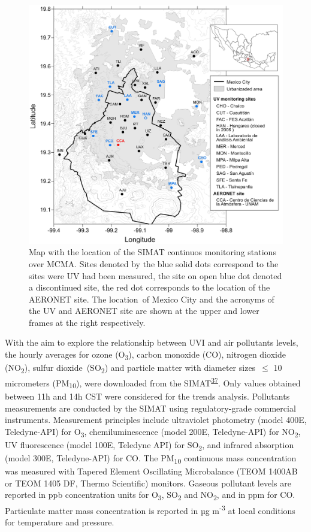 \documentclass[10pt]{article}
\begin{document}
\begin{figure}[H]
\begin{center}
\includegraphics[width=0.70\columnwidth]{figures/MapaUV v4Dec20/MapaUV v4Dec20}
\caption{{Map with the location of the SIMAT continuos monitoring stations over
MCMA. Sites denoted by the blue solid dots correspond to the sites were
UV had been measured, the site on open blue dot denoted a discontinued
site, the red dot corresponds to the location of the AERONET site. The
location~of Mexico City and the acronyms of the UV and AERONET site are
shown at the upper and lower frames at the right respectively.
{\label{977905}}%
}}
\end{center}
\end{figure}

With the aim to explore the relationship between UVI and air pollutants
levels, the hourly averages for ozone (O\textsubscript{3}), carbon
monoxide (CO), nitrogen dioxide (NO\textsubscript{2}), sulfur
dioxide~(SO\textsubscript{2}) and particle matter with diameter
sizes~\(\le\) 10 micrometers (PM\textsubscript{10}), were
downloaded from the SIMAT\textsuperscript{\hyperref[csl:37]{37}}. Only values obtained
between 11h and 14h CST were considered for the trends analysis.
Pollutants measurements are conducted by the SIMAT using
regulatory-grade commercial instruments. Measurement principles include
ultraviolet photometry (model 400E, Teledyne-API) for
O\textsubscript{3}, chemiluminescence (model 200E, Teledyne-API) for
NO\textsubscript{2}, UV fluorescence (model 100E, Teledyne API) for
SO\textsubscript{2}, and infrared absorption (model 300E, Teledyne-API)
for CO. The PM\textsubscript{10} continuous mass concentration was
measured with Tapered Element Oscillating Microbalance (TEOM 1400AB or
TEOM 1405 DF, Thermo Scientific) monitors. Gaseous pollutant levels are
reported in ppb concentration units for O\textsubscript{3},
SO\textsubscript{2} and NO\textsubscript{2}, and in ppm for CO.
Particulate matter mass concentration is reported in µg
m\textsuperscript{-3} at local conditions for temperature and pressure.
\end{document}
